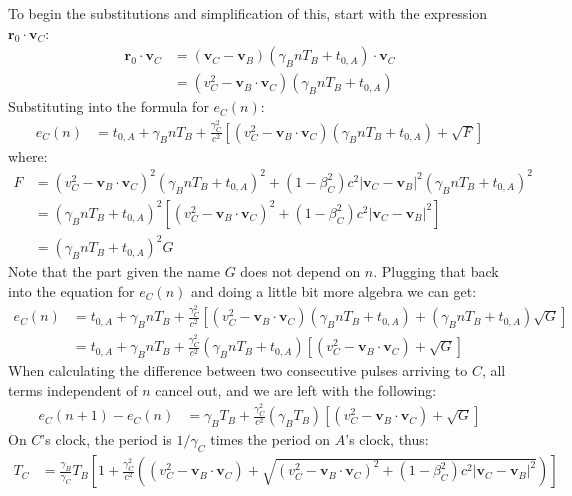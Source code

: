 \documentclass[a4paper]{article}
\theoremstyle{plain}
\theoremstyle{definition}
\newcommand{\vect}[1]{\mathbf{#1}}
\begin{document}
To begin the substitutions and simplification of this, start with the
expression $\vect{r}_0 \cdot \vect{v}_C$:
\begin{align*}
\vect{r}_0 \cdot \vect{v}_C
  & = (\vect{v}_C - \vect{v}_B) (\gamma_B n T_B + t_{0,A}) \cdot \vect{v}_C \\
  & = (v_C^2 - \vect{v}_B \cdot \vect{v}_C) (\gamma_B nT_B + t_{0,A})
\end{align*}
Substituting into the formula for $e_C(n)$:
\begin{align*}
e_{C}(n) & = t_{0,A} + \gamma_B nT_B + \frac{\gamma_C^2}{c^2} \left[ (v_C^2 - \vect{v}_B \cdot \vect{v}_C) (\gamma_B nT_B + t_{0,A}) + \sqrt{F} \right]
\end{align*}
where:
\begin{align*}
F & = (v_C^2 - \vect{v}_B \cdot \vect{v}_C)^2 (\gamma_B nT_B + t_{0,A})^2 + (1-\beta_C^2)c^2 |\vect{v}_C - \vect{v}_B|^2 (\gamma_B nT_B + t_{0,A})^2 \\
  & = (\gamma_B nT_B + t_{0,A})^2 \left[ (v_C^2 - \vect{v}_B \cdot \vect{v}_C)^2  + (1-\beta_C^2)c^2 |\vect{v}_C - \vect{v}_B|^2 \right] \\
  & = (\gamma_B nT_B + t_{0,A})^2 G
\end{align*}
Note that the part given the name $G$ does not depend on $n$.
Plugging that back into the equation for $e_C(n)$ and doing a little
bit more algebra we can get:
\begin{align*}
e_{C}(n)
  & = t_{0,A} + \gamma_B nT_B + \frac{\gamma_C^2}{c^2} \left[ (v_C^2 - \vect{v}_B \cdot \vect{v}_C) (\gamma_B nT_B + t_{0,A}) + (\gamma_B nT_B + t_{0,A}) \sqrt{G} \right] \\
  & = t_{0,A} + \gamma_B nT_B + \frac{\gamma_C^2}{c^2} (\gamma_B nT_B + t_{0,A}) \left[ (v_C^2 - \vect{v}_B \cdot \vect{v}_C) + \sqrt{G} \right]
\end{align*}
When calculating the difference between two consecutive pulses
arriving to $C$, all terms independent of $n$ cancel out, and we are
left with the following:
\begin{align*}
e_{C}(n+1) - e_{C}(n)
  & = \gamma_B T_B + \frac{\gamma_C^2}{c^2} (\gamma_B T_B) \left[ (v_C^2 - \vect{v}_B \cdot \vect{v}_C) + \sqrt{G} \right]
\end{align*}
On $C$'s clock, the period is $1/\gamma_C$ times the period on $A$'s
clock, thus:
\begin{align}
T_C
  & = \frac{\gamma_B}{\gamma_C} T_B \left[ 1 + \frac{\gamma_C^2}{c^2} \left( (v_C^2 - \vect{v}_B \cdot \vect{v}_C) + \sqrt{(v_C^2 - \vect{v}_B \cdot \vect{v}_C)^2  + (1-\beta_C^2)c^2 |\vect{v}_C - \vect{v}_B|^2} \right) \right] \label{eqn:scen1c-TC}
\end{align}
\end{document}
